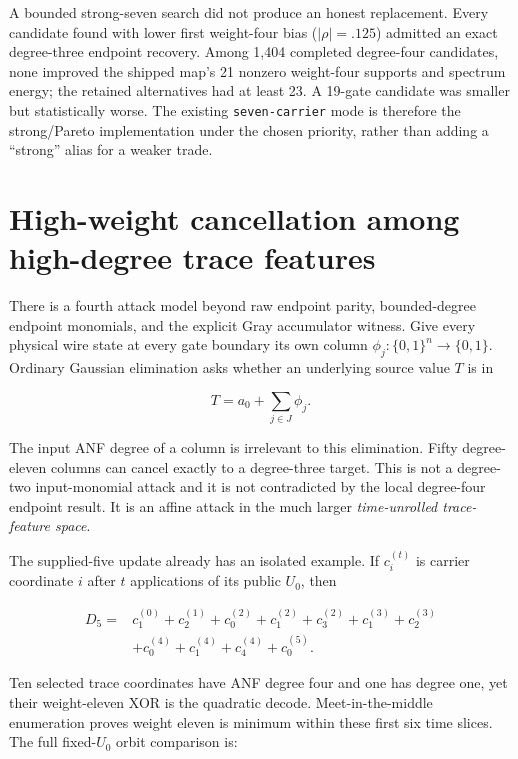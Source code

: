 \documentclass[11pt]{article}
\newcommand{\code}[1]{\texttt{#1}}
\begin{document}
A bounded strong-seven search did not produce an honest replacement.  Every
candidate found with lower first weight-four bias ($|\rho|=.125$) admitted an
exact degree-three endpoint recovery.  Among 1,404 completed degree-four
candidates, none improved the shipped map's 21 nonzero weight-four supports
and spectrum energy; the retained alternatives had at least 23.  A 19-gate
candidate was smaller but statistically worse.  The existing
\code{seven-carrier} mode is therefore the strong/Pareto implementation under
the chosen priority, rather than adding a ``strong'' alias for a weaker trade.

\section{High-weight cancellation among high-degree trace features}

There is a fourth attack model beyond raw endpoint parity, bounded-degree
endpoint monomials, and the explicit Gray accumulator witness.  Give every
physical wire state at every gate boundary its own column
$\phi_j:\{0,1\}^n\to\{0,1\}$.  Ordinary Gaussian elimination asks whether an
underlying source value $T$ is in

\[
  T=a_0+\sum_{j\in J}\phi_j .
\]

The input ANF degree of a column is irrelevant to this elimination.  Fifty
degree-eleven columns can cancel exactly to a degree-three target.  This is
not a degree-two input-monomial attack and it is not contradicted by the local
degree-four endpoint result.  It is an affine attack in the much larger
\emph{time-unrolled trace-feature space}.

The supplied-five update already has an isolated example.  If
$c_i^{(t)}$ is carrier coordinate $i$ after $t$ applications of its public
$U_0$, then

\begin{align*}
D_5={}&c_1^{(0)}+c_2^{(1)}+c_0^{(2)}+c_1^{(2)}+c_3^{(2)}
       +c_1^{(3)}+c_2^{(3)}\\
    &+c_0^{(4)}+c_1^{(4)}+c_4^{(4)}+c_0^{(5)} .
\end{align*}

Ten selected trace coordinates have ANF degree four and one has degree one,
yet their weight-eleven XOR is the quadratic decode.  Meet-in-the-middle
enumeration proves weight eleven is minimum within these first six time
slices.  The full fixed-$U_0$ orbit comparison is:
\end{document}
